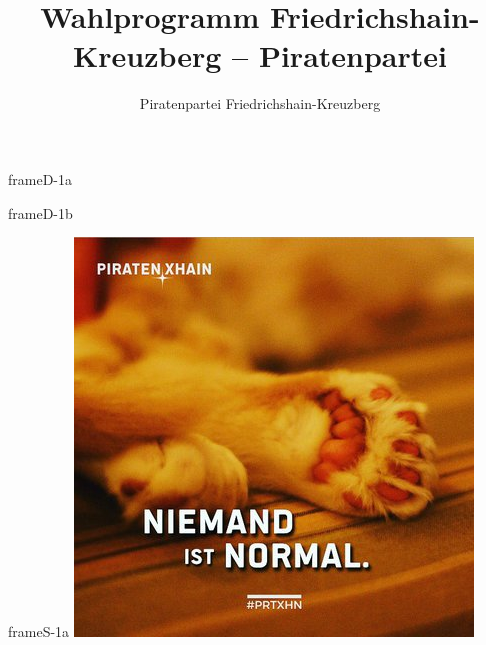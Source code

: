 \documentclass[a4paper,10pt]{article}
\title{Wahlprogramm Friedrichshain-Kreuzberg -- Piratenpartei}
\author{Piratenpartei Friedrichshain-Kreuzberg}
\date{\relax}
\begin{document}
\pagestyle{empty}
\sloppy 

\begin{dynamiccontents*}{frameD-1a}
\end{dynamiccontents*}

\begin{dynamiccontents*}{frameD-1b}
\end{dynamiccontents*}


\begin{staticcontents*}{frameS-1a}
\includegraphics[viewport = {0cm 0cm 21cm 16cm}, clip]{images/blog/small/niemandistnormal.jpg}
\end{staticcontents*}
\end{document}

